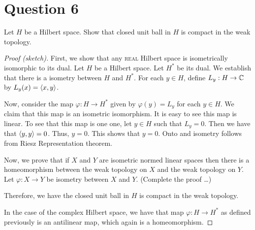 \section{Question 6}
\horz

Let $H$ be a Hilbert space. Show that closed unit ball in $H$ is compact in the weak topology.

\horz

\begin{proof}[Proof (sketch)]
    First, we show that any \textsc{real} Hilbert space is isometrically isomorphic to its dual. Let $H$ be a Hilbert space. Let $H^{*}$ be its dual. We establish that there is a isometry between $H$ and $H^{*}$. For each $y\in H$, define $L_{y} : H \to \mathbb C$ by $L_{y} (x) = \left\langle x,y \right\rangle$.

    Now, consider the map $\varphi : H \to H^{*}$ given by $\varphi \left( y \right) = L_{y}$ for each $y\in H$. We claim that this map is an isometric isomorphism. It is easy to see this map is linear. To see that this map is one one, let $y \in H$ such that $L_{y} = 0$. Then we have that $\left\langle y,y \right\rangle =0$. Thus, $y=0$. This shows that $y =0$. Onto and isometry follows from Riesz Representation theorem.

    Now, we prove that if $X$ and $Y$ are isometric normed linear spaces then there is a homeomorphism between the weak topology on $X$ and the weak topology on $Y$. Let $\varphi : X \to Y$ be isometry between $X$ and $Y$. (Complete the proof \ldots)

    Therefore, we have the closed unit ball in $H$ is compact in the weak topology.

    In the case of the complex Hilbert space, we have that map $\varphi : H \to H^{*}$ as defined previously is an antilinear map, which again is a homeomorphism.
\end{proof}
